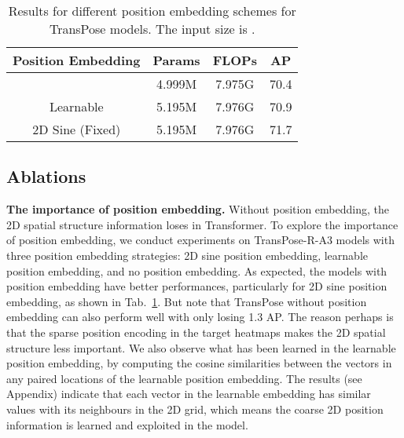 \documentclass{article}
\begin{document}
\label{position embedding}
\begin{table}[h]
	\begin{center}
		\setlength{\tabcolsep}{2mm}
		\renewcommand{\arraystretch}{0.8}
		\begin{tabular}{c|ccc}
			\toprule
			Position Embedding & Params & FLOPs &AP   \\
			
			\midrule
			\ding{55}& 4.999M & 7.975G& 70.4  \\ 
			Learnable & 5.195M & 7.976G& 70.9 \\ 
			2D Sine (Fixed)& 5.195M&7.976G&71.7 \\ 
			\bottomrule
		\end{tabular}
	\end{center}
	\caption{Results for different position embedding schemes for TransPose models. The input size is .}
	\setlength{\belowcaptionskip}{-2pt}
	\label{position embedding tab}
\end{table}

\subsection{Ablations}
{\bf The importance of position embedding.} Without position embedding, the 2D spatial structure information loses in Transformer. To explore the importance of position embedding, we conduct experiments on TransPose-R-A3 models with three position embedding strategies: 2D sine position embedding, learnable position embedding, and no position embedding. As expected, the models with position embedding have better performances, particularly for 2D sine position embedding, as shown in Tab.~\ref{position embedding tab}. But note that TransPose without position embedding can also perform well with only losing 1.3 AP. The reason perhaps is that the sparse position encoding in the target heatmaps makes the 2D spatial structure less important. We also observe what has been learned in the learnable position embedding, by computing the cosine similarities between the vectors in any paired locations of the learnable position embedding. The results (see Appendix) indicate that each vector in the learnable embedding has similar values with its neighbours in the 2D grid, which means the coarse 2D position information is learned and exploited in the model. 
\end{document}

